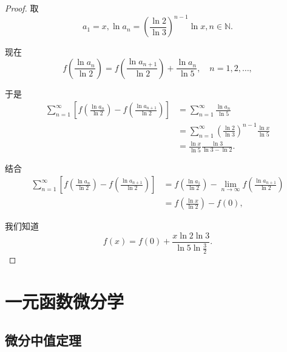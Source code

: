 \documentclass[lang=cn,10pt,thmcnt=section]{elegantbook}
\begin{document}
\begin{proof}
	取
\[
a_1 = x, \ln a_n = \left(\frac{\ln 2}{\ln 3}\right)^{n-1} \ln x, n \in \mathbb{N}.
\]

\noindent
现在
\[
f\left(\frac{\ln a_n}{\ln 2}\right) = f\left(\frac{\ln a_{n+1}}{\ln 2}\right) + \frac{\ln a_n}{\ln 5}, \quad n = 1, 2, \dots,
\]

\noindent
于是
\begin{align*}
\sum_{n=1}^{\infty} \left[ f\left(\frac{\ln a_n}{\ln 2}\right) - f\left(\frac{\ln a_{n+1}}{\ln 2}\right) \right] 
&= \sum_{n=1}^{\infty} \frac{\ln a_n}{\ln 5} \\
&= \sum_{n=1}^{\infty} \left(\frac{\ln 2}{\ln 3}\right)^{n-1} \frac{\ln x}{\ln 5} \\
&= \frac{\ln x}{\ln 5} \frac{\ln 3}{\ln 3 - \ln 2}.
\end{align*}

结合
\begin{align*}
\sum_{n=1}^{\infty} \left[ f\left(\frac{\ln a_n}{\ln 2}\right) - f\left(\frac{\ln a_{n+1}}{\ln 2}\right) \right] 
&= f\left(\frac{\ln a_1}{\ln 2}\right) - \lim_{n\to\infty} f\left(\frac{\ln a_{n+1}}{\ln 2}\right) \\
&= f\left(\frac{\ln x}{\ln 2}\right) - f(0),
\end{align*}

\noindent
我们知道
\[
f(x) = f(0) + \frac{x \ln 2 \ln 3}{\ln 5 \ln \frac{3}{2}}.
\]
\end{proof}
\chapter{一元函数微分学}
\section{微分中值定理}
\end{document}
